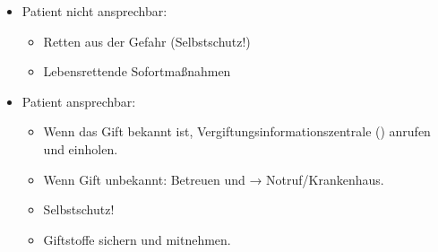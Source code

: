 \label{m:ehi-vergiftungen}
\begin{itemize}
    \item Patient nicht ansprechbar:
    \begin{itemize}
        \item Retten aus der Gefahr (Selbstschutz!)
        \item Lebensrettende Sofortmaßnahmen
    \end{itemize}
    \item Patient ansprechbar:
    \begin{itemize}
        \item Wenn das Gift bekannt ist, Vergiftungsinformationszentrale
        () anrufen und  einholen.
        \item Wenn Gift unbekannt: Betreuen und → Notruf/Krankenhaus.
        \item Selbstschutz!
        \item Giftstoffe sichern und mitnehmen.
    \end{itemize}
\end{itemize}